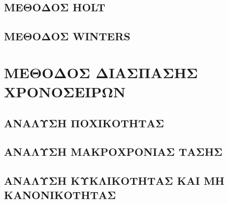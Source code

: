 \subsection{ ΜΕΘΟΔΟΣ HOLT}


\subsection{ΜΕΘΟΔΟΣ WINTERS}
\section{ΜΕΘΟΔΟΣ ΔΙΑΣΠΑΣΗΣ ΧΡΟΝΟΣΕΙΡΩΝ}
\subsection{ΑΝΑΛΥΣΗ ΠΟΧΙΚΟΤΗΤΑΣ }
\subsection{ΑΝΑΛΥΣΗ ΜΑΚΡΟΧΡΟΝΙΑΣ ΤΑΣΗΣ}
\subsection{ΑΝΑΛΥΣΗ ΚΥΚΛΙΚΟΤΗΤΑΣ ΚΑΙ ΜΗ ΚΑΝΟΝΙΚΟΤΗΤΑΣ}







\endinput
